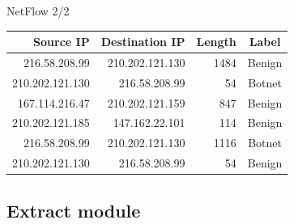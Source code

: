 \documentclass{beamer}
\begin{document}
	\begin{frame}{NetFlow 2/2}
		\begin{longtable}[h]{r r r c}
			\hline
			\textbf{Source IP} & \textbf{Destination IP} & \textbf{Length} & \textbf{Label} \\ \hline \hline
			216.58.208.99 & 210.202.121.130 & 1484 & Benign \\ \hline
			210.202.121.130 & 216.58.208.99 & 54 & Botnet \\ \hline
			167.114.216.47 & 210.202.121.159 & 847 & Benign \\ \hline
			210.202.121.185 & 147.162.22.101 & 114 & Benign \\ \hline
			216.58.208.99 & 210.202.121.130 & 1116 & Botnet \\ \hline
			210.202.121.130 & 216.58.208.99 & 54 & Benign \\ \hline
		\end{longtable}
	\end{frame}
	
	\subsection{Extract module}
	
\end{document}
